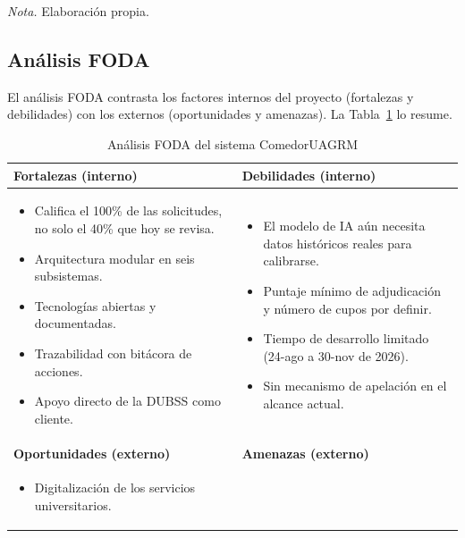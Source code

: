 \begin{table}[H]
\smallskip
\noindent\raggedright\textit{Nota.} Elaboración propia.
\end{table}

\subsection{Análisis FODA}\label{sec:feria_foda}

El análisis FODA contrasta los factores internos del proyecto (fortalezas y debilidades) con los externos (oportunidades y amenazas). La Tabla~\ref{tab:feria_foda} lo resume.

\begin{table}[H]
\caption{Análisis FODA del sistema ComedorUAGRM}
\label{tab:feria_foda}
\centering
\footnotesize\linespread{1}\selectfont
\renewcommand{\arraystretch}{1.2}
\begin{tabular}{|>{\raggedright\arraybackslash}p{7.4cm}|>{\raggedright\arraybackslash}p{7.4cm}|}
\hline
\textbf{Fortalezas (interno)} & \textbf{Debilidades (interno)} \\
\hline
\begin{itemize}\setlength\itemsep{0pt}\setlength\leftmargin{0pt}
\item Califica el 100\% de las solicitudes, no solo el 40\% que hoy se revisa.
\item Arquitectura modular en seis subsistemas.
\item Tecnologías abiertas y documentadas.
\item Trazabilidad con bitácora de acciones.
\item Apoyo directo de la DUBSS como cliente.
\end{itemize} &
\begin{itemize}\setlength\itemsep{0pt}\setlength\leftmargin{0pt}
\item El modelo de IA aún necesita datos históricos reales para calibrarse.
\item Puntaje mínimo de adjudicación y número de cupos por definir.
\item Tiempo de desarrollo limitado (24-ago a 30-nov de 2026).
\item Sin mecanismo de apelación en el alcance actual.
\end{itemize} \\
\hline
\textbf{Oportunidades (externo)} & \textbf{Amenazas (externo)} \\
\hline
\begin{itemize}\setlength\itemsep{0pt}\setlength\leftmargin{0pt}
\item Digitalización de los servicios universitarios.

\end{itemize}
\end{tabular}
\end{table}
